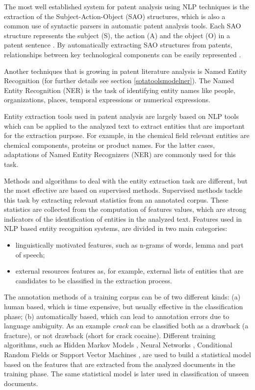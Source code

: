 \documentclass[]{book}
\providecommand{\tightlist}{%
  \setlength{\itemsep}{0pt}\setlength{\parskip}{0pt}}
\begin{document}
The most well established system for patent analysis using NLP
techniques is the extraction of the Subject-Action-Object (SAO)
structures, which is also a common use of syntactic parsers in automatic
patent analysis tools. Each SAO structure represents the subject (S),
the action (A) and the object (O) in a patent sentence
\citep{yoon2011identifying}. By automatically extracting SAO structures
from patents, relationships between key technological components can be
easily represented \citep[\citet{choi2011sao},
\citet{park2011identifying}]{yoon2013identifying}.

Another techniques that is growing in patent literature analysis is
Named Entity Recognition (for further details see section
\ref{sotatoolsmodelner}). The Named Entity Recognition (NER) is the task
of identifying entity names like people, organizations, places, temporal
expressions or numerical expressions.

Entity extraction tools used in patent analysis are largely based on NLP
tools which can be applied to the analyzed text to extract entities that
are important for the extraction purpose. For example, in the chemical
field relevant entities are chemical components, proteins or product
names. For the latter cases, adaptations of Named Entity Recognizers
(NER) are commonly used for this task.

Methods and algorithms to deal with the entity extraction task are
different, but the most effective are based on supervised methods.
Supervised methods tackle this task by extracting relevant statistics
from an annotated corpus. These statistics are collected from the
computation of features values, which are strong indicators of the
identification of entities in the analyzed text. Features used in NLP
based entity recognition systems, are divided in two main categories:

\begin{itemize}
\tightlist
\item
  linguistically motivated features, such as n-grams of words, lemma and
  part of speech;
\item
  external resources features as, for example, external lists of
  entities that are candidates to be classified in the extraction
  process.
\end{itemize}

The annotation methods of a training corpus can be of two different
kinds: (a) human based, which is time expensive, but usually effective
in the classification phase; (b) automatically based, which can lead to
annotation errors due to language ambiguity. As an example \emph{crack}
can be classified both as a drawback (a fracture), or not drawback
(short for crack cocaine). Different training algorithms, such as Hidden
Markov Models \citep{hmm}, Neural Networks \citep{nnet}, Conditional
Random Fields \citep{crf} or Support Vector Machines \citep{svm}, are
used to build a statistical model based on the features that are
extracted from the analyzed documents in the training phase. The same
statistical model is later used in classification of unseen documents.
\end{document}

